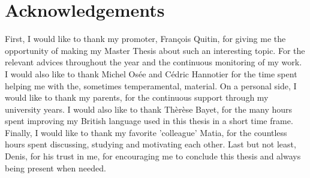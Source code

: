 % 			 
%
%

\chapter*{Acknowledgements}

First, I would like to thank my promoter, François Quitin, for giving me the opportunity of making my Master Thesis about such an interesting topic. For the relevant advices throughout the year and the continuous monitoring of my work.
I would also like to thank Michel Osée and Cédric Hannotier for the time spent helping me with the, sometimes temperamental, material. On a personal side, I would like to thank my parents, for the continuous support through my university years. I would also like to thank Thèrèse Bayet, for the many hours spent improving my British language used in this thesis in a short time frame. Finally, I would like to thank my favorite 'colleague' Matia, for the countless hours spent discussing, studying and motivating each other. Last but not least, Denis, for his trust in me, for encouraging me to conclude this thesis and always being present when needed.